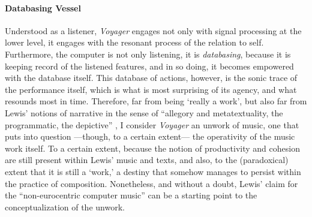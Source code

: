 \paragraph{Databasing Vessel}
Understood as a listener, \textit{Voyager} engages not only with signal processing at the lower level, it engages with the resonant process of the relation to self. Furthermore, the computer is not only listening, it is \textit{databasing}, because it is keeping record of the listened features, and in so doing, it becomes empowered with the database itself. This database of actions, however, is the sonic trace of the performance itself, which is what is most surprising of its agency, and what resounds most in time. Therefore, far from being `really a work', but also far from Lewis' notions of narrative in the sense of ``allegory and metatextuality, the programmatic, the depictive'' \parencite[110]{Lew99:Int}, I consider \textit{Voyager} an unwork of music, one that puts into question ---though, to a certain extent--- the operativity of the music work itself. To a certain extent, because the notion of productivity and cohesion are still present within Lewis' music and texts, and also, to the (paradoxical) extent that it is still a `work,' a destiny that somehow manages to persist within the practice of composition. Nonetheless, and without a doubt, Lewis' claim for the ``non-eurocentric computer music'' \parencite[107]{Lew99:Int} can be a starting point to the conceptualization of the unwork.

